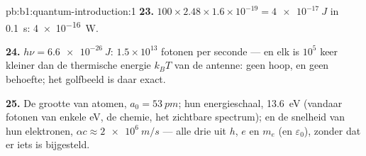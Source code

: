 \begin{solution}{pb:b1:quantum-introduction:1}
\textbf{23.} $100 \times 2.48 \times 1.6 \times 10^{-19} = \qty{4e-17}{J}$ in \qty{0.1}{s}:
\qty{4e-16}{W}.

\textbf{24.} $h\nu = \qty{6.6e-26}{J}$: $1.5 \times 10^{13}$ fotonen per seconde ---
en elk is $10^5$ keer kleiner dan de thermische energie $k_BT$ van de
antenne: geen hoop, en geen behoefte; het golfbeeld is daar exact.

\textbf{25.} De grootte van atomen, $a_0 = \qty{53}{pm}$; hun energieschaal,
\qty{13.6}{eV} (vandaar fotonen van enkele eV, de chemie, het zichtbare spectrum); en
de snelheid van hun elektronen, $\alpha c \approx \qty{2e6}{m/s}$ --- alle drie
uit $h$, $e$ en $m_e$ (en $\varepsilon_0$), zonder dat er iets is bijgesteld.
\end{solution}
